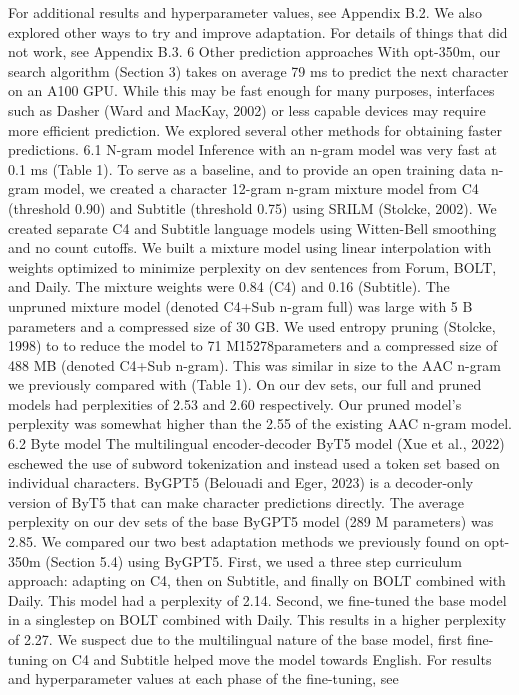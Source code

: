 For additional results and hyperparameter values,
see Appendix B.2. We also explored other ways to
try and improve adaptation. For details of things
that did not work, see Appendix B.3.
6 Other prediction approaches
With opt-350m, our search algorithm (Section 3)
takes on average 79 ms to predict the next character
on an A100 GPU. While this may be fast enough
for many purposes, interfaces such as Dasher (Ward
and MacKay, 2002) or less capable devices may
require more efficient prediction. We explored several other methods for obtaining faster predictions.
6.1 N-gram model
Inference with an n-gram model was very fast at
0.1 ms (Table 1). To serve as a baseline, and to
provide an open training data n-gram model, we
created a character 12-gram n-gram mixture model
from C4 (threshold 0.90) and Subtitle (threshold
0.75) using SRILM (Stolcke, 2002). We created
separate C4 and Subtitle language models using
Witten-Bell smoothing and no count cutoffs. We
built a mixture model using linear interpolation
with weights optimized to minimize perplexity on
dev sentences from Forum, BOLT, and Daily. The
mixture weights were 0.84 (C4) and 0.16 (Subtitle).
The unpruned mixture model (denoted C4+Sub
n-gram full) was large with 5 B parameters and a
compressed size of 30 GB. We used entropy pruning (Stolcke, 1998) to to reduce the model to 71 M15278parameters and a compressed size of 488 MB (denoted C4+Sub n-gram). This was similar in size to
the AAC n-gram we previously compared with (Table 1). On our dev sets, our full and pruned models
had perplexities of 2.53 and 2.60 respectively. Our
pruned model’s perplexity was somewhat higher
than the 2.55 of the existing AAC n-gram model.
6.2 Byte model
The multilingual encoder-decoder ByT5 model
(Xue et al., 2022) eschewed the use of subword
tokenization and instead used a token set based on
individual characters. ByGPT5 (Belouadi and Eger,
2023) is a decoder-only version of ByT5 that can
make character predictions directly.
The average perplexity on our dev sets of the
base ByGPT5 model (289 M parameters) was 2.85.
We compared our two best adaptation methods we
previously found on opt-350m (Section 5.4) using
ByGPT5. First, we used a three step curriculum
approach: adapting on C4, then on Subtitle, and
finally on BOLT combined with Daily. This model
had a perplexity of 2.14.
Second, we fine-tuned the base model in a singlestep on BOLT combined with Daily. This results
in a higher perplexity of 2.27. We suspect due
to the multilingual nature of the base model, first
fine-tuning on C4 and Subtitle helped move the
model towards English. For results and hyperparameter values at each phase of the fine-tuning, see

